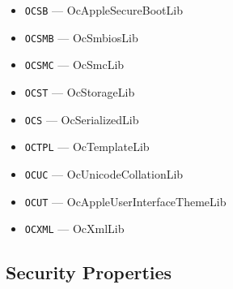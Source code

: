 \documentclass[]{article}
\begin{document}
\begin{enumerate}
\begin{itemize}
  \item \texttt{OCSB} --- OcAppleSecureBootLib
  \item \texttt{OCSMB} --- OcSmbiosLib
  \item \texttt{OCSMC} --- OcSmcLib
  \item \texttt{OCST} --- OcStorageLib
  \item \texttt{OCS} --- OcSerializedLib
  \item \texttt{OCTPL} --- OcTemplateLib
  \item \texttt{OCUC} --- OcUnicodeCollationLib
  \item \texttt{OCUT} --- OcAppleUserInterfaceThemeLib
  \item \texttt{OCXML} --- OcXmlLib
  \end{itemize}

\end{enumerate}

\subsection{Security Properties}\label{miscsecurityprops}
\end{document}
